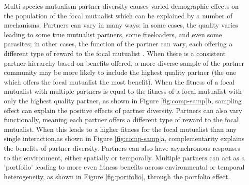 \documentclass[12pt,a4paper]{article}
\begin{document}
Multi-species mutualism partner diversity causes varied demographic effects on the population of the focal mutualist which can be explained by a number of mechanisms.
Partners can vary in many ways: in some cases, the quality varies leading to some true mutualist partners, some freeloaders, and even some parasites\cite{Bronstein1994,Bronstein2001a,Afkhami2014,Song2020,West2007,Frederickson2013,Jones2015}; in other cases, the function of the partner can vary, each offering a different type of reward to the focal mutualist \cite{Stanton2003}.
When there is a consistent partner hierarchy based on benefits offered, a more diverse sample of the partner community may be more likely to include the highest quality partner (the one which offers the focal mutualist the most benefit)\cite{Frederickson2013}.
When the fitness of a focal mutualist with multiple partners is equal to the fitness of a focal mutualist with only the highest quality partner, as shown in Figure \ref{fig:comp-samp}b, sampling effect can explain the positive effects of partner diversity\cite{Batstone2018}. 
Partners can also vary functionally, meaning each partner offers a different type of reward to the focal mutualist\cite{Stachowicz2005,Bronstein2006,Stanton2003}.
When this leads to a higher fitness for the focal mutualist than any single interaction,as shown in Figure \ref{fig:comp-samp}a, complementarity explains the benefits of partner diversity\cite{Batstone2018}. 
Partners can also have asynchronous responses to the environment, either spatially\cite{Ollerton2006} or temporally\cite{Alarcon2008}.
Multiple partners can act as a 'portfolio' leading to more even fitness benefits across environmental or temporal heterogeneity, as shown in Figure \ref{fig:portfolio}, through the portfolio effect\cite{Batstone2018,Lazaro2022}.
\end{document}
